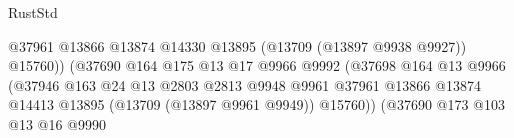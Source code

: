 \begin{lexlean}{RustStd}
\begin{coremodule}
                                                            @37961
                                                            @13866
                                                            @13874
                                                            @14330
                                                            @13895
                                                            (@13709 (@13897 @9938 @9927))
                                                            @15760))
                                                        (@37690
                                                          @164
                                                          @175
                                                          @13
                                                          @17
                                                          @9966
                                                          @9992
                                                          (@37698
                                                            @164
                                                            @13
                                                            @9966
                                                            (@37946
                                                              @163
                                                              @24
                                                              @13
                                                              @2803
                                                              @2813
                                                              @9948
                                                              @9961
                                                              @37961
                                                              @13866
                                                              @13874
                                                              @14413
                                                              @13895
                                                              (@13709 (@13897 @9961 @9949))
                                                              @15760))
                                                          (@37690
                                                            @173
                                                            @103
                                                            @13
                                                            @16
                                                            @9990

\end{coremodule}
\end{lexlean}
